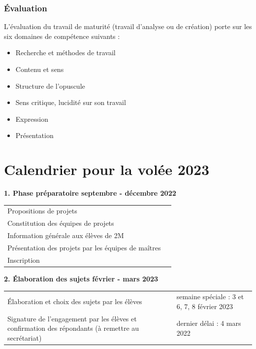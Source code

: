 \documentclass[
  10pt,
  french,
  a5paper,
  openany]{book}
\providecommand{\tightlist}{%
  \setlength{\itemsep}{0pt}\setlength{\parskip}{0pt}}
\begin{document}
\hypertarget{uxe9valuation-1}{%
\subsection*{Évaluation}\label{uxe9valuation-1}}

L'évaluation du travail de maturité (travail d'analyse ou de création) porte sur les six domaines de compétence suivants :

\begin{itemize}
\tightlist
\item
  Recherche et méthodes de travail
\item
  Contenu et sens
\item
  Structure de l'opuscule
\item
  Sens critique, lucidité sur son travail
\item
  Expression
\item
  Présentation
\end{itemize}

\hypertarget{calendrier-pour-la-voluxe9e-2023}{%
\chapter*{Calendrier pour la volée 2023}\label{calendrier-pour-la-voluxe9e-2023}}


\textbf{1. Phase préparatoire \hfill septembre - décembre 2022}

\begin{longtable}[]{@{}ll@{}}
\toprule
\endhead
Propositions de projets &\tabularnewline
Constitution des équipes de projets &\tabularnewline
Information générale aux élèves de 2M &\tabularnewline
Présentation des projets par les équipes de maîtres &\tabularnewline
Inscription &\tabularnewline
\bottomrule
\end{longtable}


\textbf{2. Élaboration des sujets \hfill février - mars 2023}

\begin{longtable}[]{@{}ll@{}}
\toprule
\endhead
\begin{minipage}[t]{0.65\columnwidth}\raggedright
Élaboration et choix des sujets par les élèves\strut
\end{minipage} & \begin{minipage}[t]{0.29\columnwidth}\raggedright
semaine spéciale : 3 et 6, 7, 8 février 2023\strut
\end{minipage}\tabularnewline
\begin{minipage}[t]{0.65\columnwidth}\raggedright
Signature de l'engagement par les élèves et confirmation des répondants (à remettre au secrétariat)\strut
\end{minipage} & \begin{minipage}[t]{0.29\columnwidth}\raggedright
dernier délai : 4 mars 2022\strut
\end{minipage}\tabularnewline
\bottomrule
\end{longtable}
\end{document}
